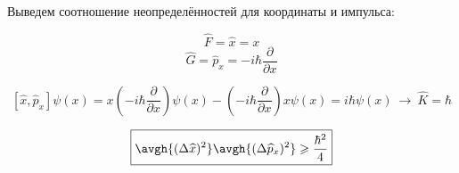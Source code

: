 \begin{exmpl} Выведем соотношение неопределённостей для координаты и импульса:

$$\widehat{F}=\widehat{x}=x$$
$$\widehat{G}=\widehat{p}_x=-i\hbar\frac{\partial}{\partial{x}}$$

$$[\widehat{x},\widehat{p}_x]\psi(x)=x(-i\hbar\frac{\partial}{\partial{x}})\psi(x)-(-i\hbar\frac{\partial}{\partial{x}})x\psi(x)=i\hbar\psi(x)~\to~\widehat{K}=\hbar$$


$$\boxed{\avgh{(\Delta\widehat{x})^2}\avgh{(\Delta\widehat{p}_x)^2} \geqslant \frac{\hbar^2}{4}}$$
\end{exmpl}